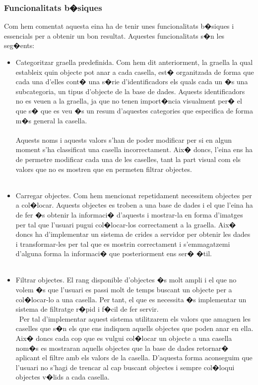 \documentclass[12pt,a4paper,openright,oneside]{article}
\numberwithin{equation}{section}
\theoremstyle{definition}
\begin{document}
\subsubsection{Funcionalitats b�siques}
Com hem comentat aquesta eina ha de tenir unes funcionalitats b�siques i essencials per a obtenir un bon resultat. Aquestes funcionalitats s�n les seg�ents:
\begin{itemize}
\item Categoritzar graella predefinida. Com hem dit anteriorment, la graella la qual estableix quin objecte pot anar a cada casella, est� organitzada de forma que cada una d'elles cont� una s�rie d'identificadors els quals cada un �s una subcategoria, un tipus d'objecte de la base de dades. Aquests identificadors no es veuen a la graella, ja que no tenen import�ncia visualment per� el que s� que es veu �s un resum d'aquestes categories que especifica de forma m�s general la casella.\\\\
Aquests noms i aquests valors s'han de poder modificar per si en algun moment s'ha classificat una casella incorrectament. Aix� doncs, l'eina ens ha de permetre modificar cada una de les caselles, tant la part visual com els valors que no es mostren que en permeten filtrar objectes.\\\
\item Carregar objectes. Com hem mencionat repetidament necessitem objectes per a col�locar. Aquests objectes es troben a una base de dades i el que l'eina ha de fer �s obtenir la informaci� d'aquests i mostrar-la en forma d'imatges per tal que l'usuari pugui col�locar-los correctament a la graella. Aix� doncs ha d'implementar un sistema de crides a servidor per obtenir les dades i transformar-les per tal que es mostrin correctament i s'emmagatzemi d'alguna forma la informaci� que posteriorment ens ser� �til.\\\
\item Filtrar objectes. El rang disponible d'objectes �s molt ampli i el que no volem �s que l'usuari es passi molt de temps buscant un objecte per a col�locar-lo a una casella. Per tant, el que es necessita �s implementar un sistema de filtratge r�pid i f�cil de fer servir.\\\
Per tal d'implementar aquest sistema utilitzarem els valors que amaguen les caselles que s�n els que ens indiquen aquells objectes que poden anar en ella. Aix� doncs cada cop que es vulgui col�locar un objecte a una casella nom�s es mostraran aquells objectes que la base de dades retornar� aplicant el filtre amb els valors de la casella. D'aquesta forma aconseguim que l'usuari no s'hagi de trencar al cap buscant objectes i sempre col�loqui objectes v�lids a cada casella. \\\

\end{itemize}
\end{document}

